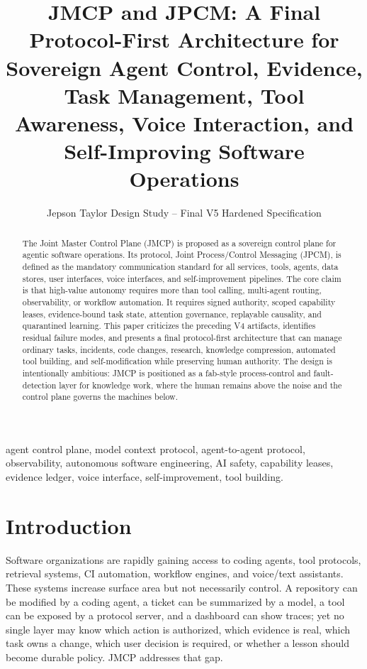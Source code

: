 \documentclass[10pt,journal,onecolumn]{IEEEtran}
\title{JMCP and JPCM: A Final Protocol-First Architecture for Sovereign Agent Control, Evidence, Task Management, Tool Awareness, Voice Interaction, and Self-Improving Software Operations}
\author{Jepson Taylor Design Study -- Final V5 Hardened Specification}
\begin{document}
\maketitle
\begin{abstract}
The Joint Master Control Plane (JMCP) is proposed as a sovereign control plane for agentic software operations. Its protocol, Joint Process/Control Messaging (JPCM), is defined as the mandatory communication standard for all services, tools, agents, data stores, user interfaces, voice interfaces, and self-improvement pipelines. The core claim is that high-value autonomy requires more than tool calling, multi-agent routing, observability, or workflow automation. It requires signed authority, scoped capability leases, evidence-bound task state, attention governance, replayable causality, and quarantined learning. This paper criticizes the preceding V4 artifacts, identifies residual failure modes, and presents a final protocol-first architecture that can manage ordinary tasks, incidents, code changes, research, knowledge compression, automated tool building, and self-modification while preserving human authority. The design is intentionally ambitious: JMCP is positioned as a fab-style process-control and fault-detection layer for knowledge work, where the human remains above the noise and the control plane governs the machines below.
\end{abstract}
\begin{IEEEkeywords}
agent control plane, model context protocol, agent-to-agent protocol, observability, autonomous software engineering, AI safety, capability leases, evidence ledger, voice interface, self-improvement, tool building.
\end{IEEEkeywords}

\section{Introduction}
Software organizations are rapidly gaining access to coding agents, tool protocols, retrieval systems, CI automation, workflow engines, and voice/text assistants. These systems increase surface area but not necessarily control. A repository can be modified by a coding agent, a ticket can be summarized by a model, a tool can be exposed by a protocol server, and a dashboard can show traces; yet no single layer may know which action is authorized, which evidence is real, which task owns a change, which user decision is required, or whether a lesson should become durable policy. JMCP addresses that gap.
\end{document}
